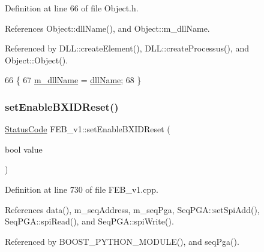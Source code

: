 Definition at line 66 of file Object.\+h.



References Object\+::dll\+Name(), and Object\+::m\+\_\+dll\+Name.



Referenced by D\+L\+L\+::create\+Element(), D\+L\+L\+::create\+Processus(), and Object\+::\+Object().


\begin{DoxyCode}
66                                       \{
67     \hyperlink{classObject_a01afbeacebb8db6831559972ec362eb3}{m\_dllName} = \hyperlink{classObject_a2e3947f2870094c332d7454117f3ec63}{dllName};
68   \}
\end{DoxyCode}
\mbox{\label{classFEB__v1_a2ad20ff9db6a0ceef875d874bae214a9}} 
\subsubsection{\texorpdfstring{set\+Enable\+B\+X\+I\+D\+Reset()}{setEnableBXIDReset()}}
{\footnotesize\ttfamily \hyperlink{classStatusCode}{Status\+Code} F\+E\+B\+\_\+v1\+::set\+Enable\+B\+X\+I\+D\+Reset (\begin{DoxyParamCaption}\item[{bool}]{value }\end{DoxyParamCaption})}



Definition at line 730 of file F\+E\+B\+\_\+v1.\+cpp.



References data(), m\+\_\+seq\+Address, m\+\_\+seq\+Pga, Seq\+P\+G\+A\+::set\+Spi\+Add(), Seq\+P\+G\+A\+::spi\+Read(), and Seq\+P\+G\+A\+::spi\+Write().



Referenced by B\+O\+O\+S\+T\+\_\+\+P\+Y\+T\+H\+O\+N\+\_\+\+M\+O\+D\+U\+L\+E(), and seq\+Pga().


